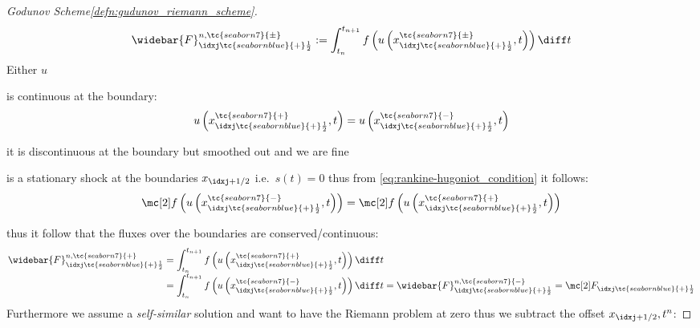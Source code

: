\begin{proofbox}\nospacing
    \begin{proof}[Godunov Scheme\cref{defn:gudunov_riemann_scheme}]\label{proof:gudonov_scheme}
        \begin{align*}
          \widebar{F}_{\idxj\tc{seabornblue}{+}\frac{1}{2}}^{n,\tc{seaborn7}{\pm}}
          :=\int_{t_{n}}^{t_{n+1}}f \left(u\left(x_{\idxj\tc{seabornblue}{+}\frac{1}{2}}^{\tc{seaborn7}{\pm}},t\right)\right)\diff t
        \end{align*}
        Either $u$
        \begin{itemizenosep}
            \item is continuous at the boundary:
                \begin{align*}
                u\left(x_{\idxj\tc{seabornblue}{+}\frac{1}{2}}^{\tc{seaborn7}{+}},t\right)
                =u\left(x_{\idxj\tc{seabornblue}{+}\frac{1}{2}}^{\tc{seaborn7}{-}},t\right)
                \end{align*}
            \item it is discontinuous at the boundary but smoothed out and we are fine
            \item is a stationary shock at the boundaries $x_{\idxj+1/2}$ i.e.\ $s(t)=0$ thus from \cref{eq:rankine-hugoniot_condition}
            it follows:
            \begin{align*}
             \flux\left(u\left(x_{\idxj\tc{seabornblue}{+}\frac{1}{2}}^{\tc{seaborn7}{-}},t\right)\right)
              =\flux\left(u\left(x_{\idxj\tc{seabornblue}{+}\frac{1}{2}}^{\tc{seaborn7}{+}},t\right)\right)
            \end{align*}
        \end{itemizenosep}
        thus it follow that the fluxes over the boundaries are conserved/continuous:
        \begin{align}
          \widebar{F}_{\idxj\tc{seabornblue}{+}\frac{1}{2}}^{n,\tc{seaborn7}{+}}
          &=\int_{t_{n}}^{t_{n+1}}f \left(u\left(x_{\idxj\tc{seabornblue}{+}\frac{1}{2}}^{\tc{seaborn7}{+}},t\right)\right)\diff t \\[-1\jot]
          &=\int_{t_{n}}^{t_{n+1}}f \left(u\left(x_{\idxj\tc{seabornblue}{+}\frac{1}{2}}^{\tc{seaborn7}{-}},t\right)\right)\diff t
          =\widebar{F}_{\idxj\tc{seabornblue}{+}\frac{1}{2}}^{n,\tc{seaborn7}{-}}
          =\Flux_{\idxj\tc{seabornblue}{+}\frac{1}{2}}
        \end{align}
        Furthermore we assume a \textit{self-similar} solution and want to have the Riemann problem at zero thus we subtract the offset $x_{\idxj+1/2}, t^{n}$:

\end{proof}
\end{proofbox}
